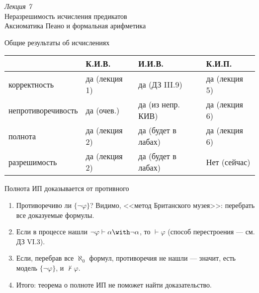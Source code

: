 \documentclass[aspectratio=169]{beamer}
\begin{document}
\begin{frame}
\begin{center}\Large {\it Лекция 7}\\\vspace{0.5cm}
Неразрешимость исчисления предикатов\\
Аксиоматика Пеано и формальная арифметика
\end{center}
\end{frame}

\begin{frame}{Общие результаты об исчислениях}
\begin{tabular}{llll}
      & К.И.В. & И.И.В. & К.И.П.\\\hline
корректность & да (лекция 1) & да (ДЗ III.9) & да (лекция 5)\\
непротиворечивость & да (очев.) & да (из непр. КИВ) & да (лекция 6)\\
полнота & да (лекция 2) & да (будет в лабах) & да (лекция 6)\\
разрешимость & да (лекция 2) & да (будет в лабах) & \pause\color{red}Нет (сейчас)
\end{tabular}
\end{frame}

\begin{frame}{Полнота ИП доказывается от противного}
\begin{enumerate}
\item Противоречиво ли $\{\neg\varphi\}$? Видимо, <<метод Британского музея>>: перебрать все доказуемые формулы. 
\item Если в процессе нашли $\neg\varphi \vdash \alpha \with \neg \alpha$, то $\vdash\varphi$ (способ перестроения --- см. ДЗ VI.3).
\item Если, {\color{olive}перебрав все $\aleph_0$ формул,} противоречия не нашли --- значит, есть модель $\{\neg\varphi\}$, и $\not\vdash\varphi$.
\item Итого: теорема о полноте ИП не поможет найти доказательство.
\end{enumerate}
\end{frame}
\end{document}
